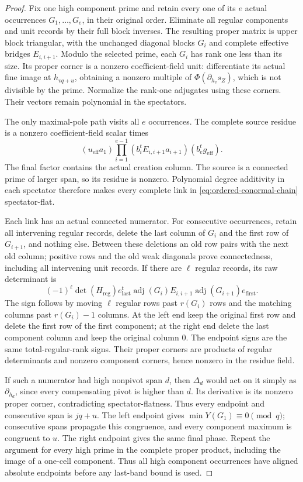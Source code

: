 \documentclass[11pt,a4paper]{amsart}
\numberwithin{equation}{section}
\theoremstyle{plain}
\theoremstyle{definition}
\DeclareMathOperator{\adj}{adj}
\begin{document}
\begin{proof}
Fix one high component prime and retain every one of its \(e\) actual
occurrences \(G_1,\ldots,G_e\), in their original order.  Eliminate all regular
components and unit records by their full block inverses.  The resulting
proper matrix is upper block triangular, with the unchanged diagonal
blocks \(G_i\) and complete effective bridges \(E_{i,i+1}\).  Modulo the selected
prime, each \(G_i\) has rank one less than its size.  Its proper corner is a
nonzero coefficient-field unit: differentiate its actual fine image at
\(h_{vq+u}\), obtaining a nonzero multiple of
\(\Phi(\partial_{h_v}s_Z)\), which is not divisible by the prime.
Normalize the rank-one adjugates using these corners.  Their vectors remain
polynomial in the spectators.

The only maximal-pole path visits all \(e\) occurrences.  The complete source
residue is a nonzero coefficient-field scalar times
\begin{equation}\label{eq:ordered-conormal-chain}
 (u_{\mathrm{eff}}a_1)
 \prod_{i=1}^{e-1}(b_i^tE_{i,i+1}a_{i+1})
 (b_e^tg_{\mathrm{eff}}).
\end{equation}
The final factor contains the actual creation column.  The source is a
connected prime of larger span, so its residue is nonzero.  Polynomial
degree additivity in each spectator therefore makes every complete link
in \eqref{eq:ordered-conormal-chain} spectator-flat.

Each link has an actual connected numerator.  For consecutive occurrences,
retain all intervening regular records, delete the last column of \(G_i\)
and the first row of \(G_{i+1}\), and nothing else.  Between these deletions an
old row pairs with the next old column; positive rows and the old weak
diagonals prove connectedness, including all intervening unit records.
If there are \(\ell\) regular records, its raw determinant is
\[
 (-1)^\ell\det(H_{\mathrm{reg}})
 e_{\mathrm{last}}^t\adj(G_i)E_{i,i+1}\adj(G_{i+1})e_{\mathrm{first}}.
\]
The sign follows by moving \(\ell\) regular rows past \(r(G_i)\) rows and the
matching columns past \(r(G_i)-1\) columns.  At the left end keep the original
first row and delete the first row of the first component; at the right
end delete the last component column and keep the original column \(0\).
The endpoint signs are the same total-regular-rank signs.  Their proper
corners are products of regular determinants and nonzero component
corners, hence nonzero in the residue field.

If such a numerator had high nonpivot span \(d\), then \(\Delta_d\) would act
on it simply as \(\partial_{h_d}\), since every compensating pivot is higher
than \(d\).  Its derivative is its nonzero proper corner, contradicting
spectator-flatness.  Thus every endpoint and consecutive span is \(jq+u\).
The left endpoint gives \(\min Y(G_1)\equiv0\pmod q\); consecutive spans
propagate this congruence, and every component maximum is congruent to
\(u\).  The right endpoint gives the same final phase.  Repeat the argument for
every high prime in the complete proper product, including the image of
a one-cell component.  Thus all high component occurrences have aligned
absolute endpoints before any last-band bound is used.


\end{proof}
\end{document}
